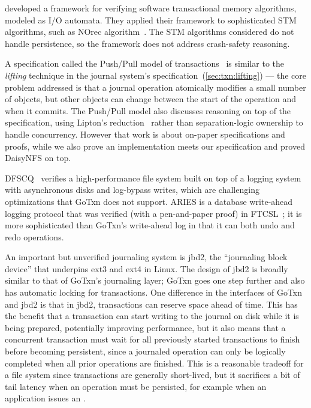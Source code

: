\citet{mohsen:stm} developed a framework for verifying software transactional memory algorithms, modeled
as I/O automata. They applied their framework to sophisticated STM algorithms, such as
NOrec algorithm~\cite{dalessandro:norec}. The STM algorithms considered do not
handle persistence, so the framework does not address crash-safety reasoning.

A specification called the Push/Pull model of
transactions~\cite{koskinen:pushpull} is similar to the \emph{lifting} technique
in the journal system's specification~(\cref{sec:txn:lifting}) --- the core
problem addressed is that a journal operation atomically modifies a small number
of objects, but other objects can change between the start of the operation and when
it commits. The Push/Pull model also discusses reasoning on top of the
specification, using Lipton's reduction~\cite{lipton:movers} rather than
separation-logic ownership to handle concurrency. However that work is about
on-paper specifications and proofs, while we also prove an implementation meets
our specification and proved DaisyNFS on top.

DFSCQ~\cite{chen:dfscq} verifies a high-performance file system built on top of
a logging system with asynchronous disks and log-bypass writes, which are
challenging optimizations that GoTxn does not support. ARIES is a database
write-ahead logging protocol that was verified (with a pen-and-paper proof) in
FTCSL~\cite{ntzik:faults}; it is more sophisticated than GoTxn's write-ahead log
in that it can both undo and redo operations.

An important but unverified journaling system is jbd2, the ``journaling block
device'' that underpins ext3 and ext4 in Linux. The design of jbd2 is broadly
similar to that of GoTxn's journaling layer; GoTxn goes one step further and
also has automatic locking for transactions. One difference in the interfaces of
GoTxn and jbd2 is that in jbd2, transactions can reserve space ahead of time.
This has the benefit that a transaction can start writing to the journal on disk
while it is being prepared, potentially improving performance, but it also means
that a concurrent transaction must wait for all previously started transactions
to finish before becoming persistent, since a journaled operation can only be
logically completed when all prior operations are finished. This is a reasonable
tradeoff for a file system since transactions are generally short-lived, but it
sacrifices a bit of tail latency when an operation must be persisted, for
example when an application issues an .

